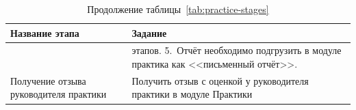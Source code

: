 \newpage
\begin{table}[h]
  \centering
  \caption*{Продолжение таблицы~\ref{tab:practice-stages}}
  \renewcommand{\arraystretch}{1.2}
  \begin{tabularx}{\textwidth}{|>{\raggedright\arraybackslash}p{}|>{\raggedright\arraybackslash}X|}
    \hline
    \textbf{Название этапа} & \textbf{Задание} \\
    \hline
    & этапов. 5.~Отчёт необходимо подгрузить в модуле практика как <<письменный отчёт>>. \\
    \hline
    Получение отзыва руководителя практики & Получить отзыв с оценкой у руководителя практики в модуле Практики \\
    \hline
  \end{tabularx}
\end{table}